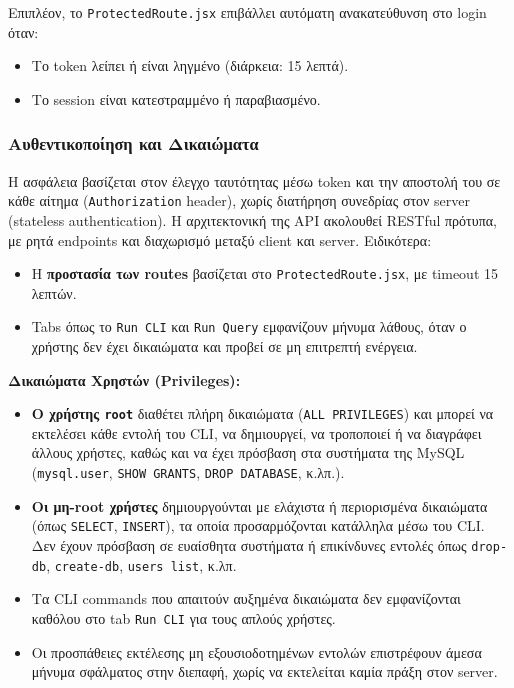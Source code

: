 \documentclass[13pt]{extarticle}
\begin{document}
Επιπλέον, το \texttt{ProtectedRoute.jsx} επιβάλλει αυτόματη ανακατεύθυνση στο login όταν:
\begin{itemize}
    \item Το token λείπει ή είναι ληγμένο (διάρκεια: 15 λεπτά).
    \item Το session είναι κατεστραμμένο ή παραβιασμένο.
\end{itemize}

\subsubsection{Αυθεντικοποίηση και Δικαιώματα}
Η ασφάλεια βασίζεται στον έλεγχο ταυτότητας μέσω token και την αποστολή του σε κάθε αίτημα (\texttt{Authorization} header), χωρίς διατήρηση συνεδρίας στον server (stateless authentication). Η αρχιτεκτονική της API ακολουθεί RESTful πρότυπα, με ρητά endpoints και διαχωρισμό μεταξύ client και server. Ειδικότερα:

\begin{itemize}
    \item Η \textbf{προστασία των routes} βασίζεται στο \texttt{ProtectedRoute.jsx}, με timeout 15 λεπτών.
    \item Tabs όπως το \texttt{Run CLI} και \texttt{Run Query} εμφανίζουν μήνυμα λάθους, όταν ο χρήστης δεν έχει δικαιώματα και προβεί σε μη επιτρεπτή ενέργεια.
\end{itemize}

\vspace{0.4cm}
\noindent\textbf{Δικαιώματα Χρηστών (Privileges):}
\begin{itemize}
    \item \textbf{Ο χρήστης \texttt{root}} διαθέτει πλήρη δικαιώματα (\texttt{ALL PRIVILEGES}) και μπορεί να εκτελέσει κάθε εντολή του CLI, να δημιουργεί, να τροποποιεί ή να διαγράφει άλλους χρήστες, καθώς και να έχει πρόσβαση στα συστήματα της MySQL (\texttt{mysql.user}, \texttt{SHOW GRANTS}, \texttt{DROP DATABASE}, κ.λπ.).
    \item \textbf{Οι μη-root χρήστες} δημιουργούνται με ελάχιστα ή περιορισμένα δικαιώματα (όπως \texttt{SELECT}, \texttt{INSERT}), τα οποία προσαρμόζονται κατάλληλα μέσω του CLI. Δεν έχουν πρόσβαση σε ευαίσθητα συστήματα ή επικίνδυνες εντολές όπως \texttt{drop-db}, \texttt{create-db}, \texttt{users list}, κ.λπ.
    \item Τα CLI commands που απαιτούν αυξημένα δικαιώματα δεν εμφανίζονται καθόλου στο tab \texttt{Run CLI} για τους απλούς χρήστες.
    \item Οι προσπάθειες εκτέλεσης μη εξουσιοδοτημένων εντολών επιστρέφουν άμεσα μήνυμα σφάλματος στην διεπαφή, χωρίς να εκτελείται καμία πράξη στον server.
\end{itemize}
\end{document}
